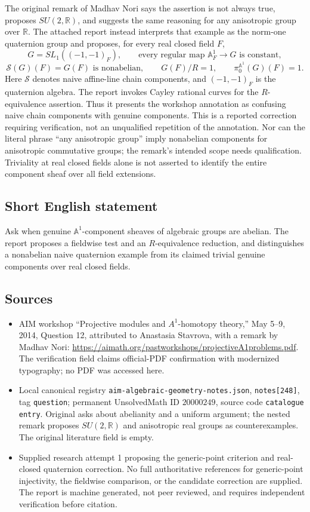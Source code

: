 \documentclass[11pt]{article}
\newcommand{\R}{\mathbb{R}}
\newcommand{\A}{\mathbb{A}}
\begin{document}
The original remark of Madhav Nori says the assertion is not always true, proposes \(SU(2,\R)\), and suggests the same reasoning for any anisotropic group over \(\R\). The attached report instead interprets that example as the norm-one quaternion group and proposes, for every real closed field \(F\),
\[
G=SL_1((-1,-1)_F),\qquad
\text{every regular map }\A^1_F\to G\text{ is constant},
\]
\[
\mathcal S(G)(F)=G(F)\text{ is nonabelian},\qquad
G(F)/R=1,\qquad \pi_0^{\A^1}(G)(F)=1.
\]
Here \(\mathcal S\) denotes naive affine-line chain components, and \((-1,-1)_F\) is the quaternion algebra. The report invokes Cayley rational curves for the \(R\)-equivalence assertion. Thus it presents the workshop annotation as confusing naive chain components with genuine components. This is a reported correction requiring verification, not an unqualified repetition of the annotation. Nor can the literal phrase ``any anisotropic group'' imply nonabelian components for anisotropic commutative groups; the remark's intended scope needs qualification. Triviality at real closed fields alone is not asserted to identify the entire component sheaf over all field extensions.
\subsection{Short English statement}
Ask when genuine \(\A^1\)-component sheaves of algebraic groups are abelian. The report proposes a fieldwise test and an \(R\)-equivalence reduction, and distinguishes a nonabelian naive quaternion example from its claimed trivial genuine components over real closed fields.
\subsection{Sources}
\begin{itemize}
\item AIM workshop ``Projective modules and \(A^1\)-homotopy theory,'' May 5--9, 2014, Question 12, attributed to Anastasia Stavrova, with a remark by Madhav Nori: \url{https://aimath.org/pastworkshops/projectiveA1problems.pdf}. The verification field claims official-PDF confirmation with modernized typography; no PDF was accessed here.
\item Local canonical registry \texttt{aim-algebraic-geometry-notes.json}, \texttt{notes[248]}, tag \texttt{question}; permanent UnsolvedMath ID \(20000249\), source code \texttt{catalogue entry}. Original asks about abelianity and a uniform argument; the nested remark proposes \(SU(2,\R)\) and anisotropic real groups as counterexamples. The original literature field is empty.
\item Supplied research attempt 1 proposing the generic-point criterion and real-closed quaternion correction. No full authoritative references for generic-point injectivity, the fieldwise comparison, or the candidate correction are supplied. The report is machine generated, not peer reviewed, and requires independent verification before citation.
\end{itemize}
\end{document}
